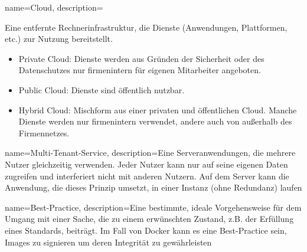 %




{%
  name={Cloud},
  description={Eine entfernte Rechnerinfrastruktur, die Dienste (Anwendungen, Plattformen, etc.) zur Nutzung bereitstellt.
    \begin{itemize}
      \item Private Cloud: Dienste werden aus Gründen der Sicherheit oder des Datenschutzes nur firmenintern für eigenen Mitarbeiter angeboten.
      \item Public Cloud: Dienste sind öffentlich nutzbar.
      \item Hybrid Cloud: Mischform aus einer privaten und öffentlichen Cloud. Manche Dienste werden nur firmenintern verwendet, andere auch von außerhalb des Firmennetzes.
    \end{itemize}\cite{cloud}
  }
}

{%
  name={Multi-Tenant-Service},
  description={Eine Serveranwendungen, die mehrere Nutzer gleichzeitig verwenden. Jeder Nutzer kann nur auf seine eigenen Daten zugreifen und interferiert nicht mit anderen Nutzern. Auf dem Server kann die Anwendung, die dieses Prinzip umsetzt, in einer Instanz (ohne Redundanz) laufen \cite{multitenant}}
}

{%
  name={Best-Practice},
  description={Eine bestimmte, ideale Vorgehensweise für dem Umgang mit einer Sache, die zu einem erwünschten Zustand, z.B. der Erfüllung eines Standards, beiträgt. Im Fall von Docker kann es eine Best-Practice sein, Images zu signieren um deren Integrität zu gewährleisten}
}




%

